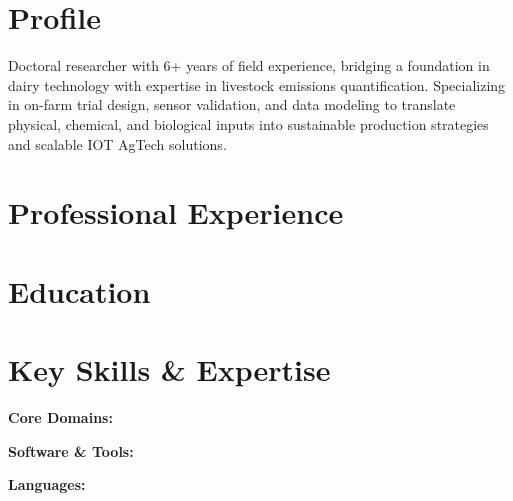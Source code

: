 \documentclass[10pt,a4paper]{article}
\begin{document}

\section*{Profile}
Doctoral researcher with 6+ years of field experience, bridging a foundation in dairy technology with expertise in livestock emissions quantification. Specializing in on-farm trial design, sensor validation, and data modeling to translate physical, chemical, and biological inputs into sustainable production strategies and scalable IOT AgTech solutions.

\section*{Professional Experience}


\section*{Education}


\section*{Key Skills \& Expertise}
\textbf{Core Domains:} \par

\textbf{Software \& Tools:} \par
\textbf{Languages:} 
\end{document}
